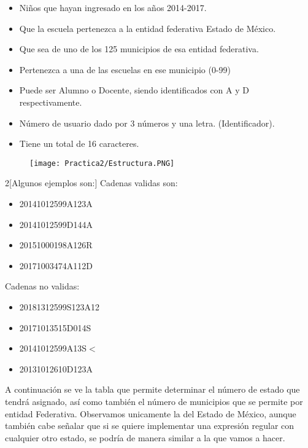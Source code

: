 \documentclass[12pt]{article}
\begin{document}
	\begin{itemize}
		\item Niños que hayan ingresado en los años 2014-2017.								
		\item Que la escuela pertenezca a la entidad federativa Estado de México. 			
		\item Que sea de uno de los 125 municipios de esa entidad federativa.				
		\item Pertenezca a una de las escuelas en ese municipio (0-99)						
		\item Puede ser Alumno o Docente, siendo identificados con A y D respectivamente.	
		\item Número de usuario dado por 3 números y una letra.	(Identificador).							
		\item Tiene un total de 16 caracteres.
	\end{itemize}

	\begin{figure}[H]
	        \centering
	        \texttt{[image: Practica2/Estructura.PNG]}
	\end{figure}
    \newpage
	\begin{multicols}{2}[Algunos ejemplos son:]
		Cadenas validas son:
		\begin{itemize}
			\item 20141012599A123A
			\item 20141012599D144A
			\item 20151000198A126R
			\item 20171003474A112D
		\end{itemize}
		\columnbreak
		Cadenas no validas:
		\begin{itemize}
			\item 20181312599S123A12  
			\item 20171013515D014S    
			\item 20141012599A13S$<$  
			\item 20131012610D123A  
			\end{itemize}
	\end{multicols}
	\newpage
	A continuación se ve la tabla que permite determinar el número de estado que tendrá asignado,
	así como también el número de municipios que se permite por entidad Federativa. Observamos
	unicamente la del Estado de México, aunque también cabe señalar que si se quiere implementar
	una expresión regular con cualquier otro estado, se podría de manera similar a la que vamos a 
	hacer. 
\end{document}
